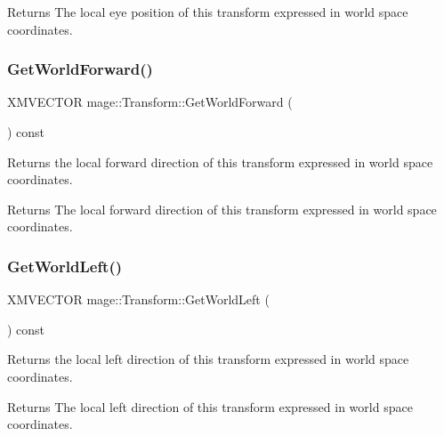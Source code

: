 \begin{DoxyReturn}{Returns}
The local eye position of this transform expressed in world space coordinates. 
\end{DoxyReturn}
\hypertarget{structmage_1_1_transform_a24bd3a710a3c0bde7a6d2f2de56a315c}{}\label{structmage_1_1_transform_a24bd3a710a3c0bde7a6d2f2de56a315c} 
\subsubsection{\texorpdfstring{Get\+World\+Forward()}{GetWorldForward()}}
{\footnotesize\ttfamily X\+M\+V\+E\+C\+T\+OR mage\+::\+Transform\+::\+Get\+World\+Forward (\begin{DoxyParamCaption}{ }\end{DoxyParamCaption}) const}

Returns the local forward direction of this transform expressed in world space coordinates.

\begin{DoxyReturn}{Returns}
The local forward direction of this transform expressed in world space coordinates. 
\end{DoxyReturn}
\hypertarget{structmage_1_1_transform_aef18a0e685f56ce4a805b2fef57287f6}{}\label{structmage_1_1_transform_aef18a0e685f56ce4a805b2fef57287f6} 
\subsubsection{\texorpdfstring{Get\+World\+Left()}{GetWorldLeft()}}
{\footnotesize\ttfamily X\+M\+V\+E\+C\+T\+OR mage\+::\+Transform\+::\+Get\+World\+Left (\begin{DoxyParamCaption}{ }\end{DoxyParamCaption}) const}

Returns the local left direction of this transform expressed in world space coordinates.

\begin{DoxyReturn}{Returns}
The local left direction of this transform expressed in world space coordinates. 
\end{DoxyReturn}
\hypertarget{structmage_1_1_transform_aad81c0c7af0f29bb3ead6c8112de262c}{}\label{structmage_1_1_transform_aad81c0c7af0f29bb3ead6c8112de262c} 
